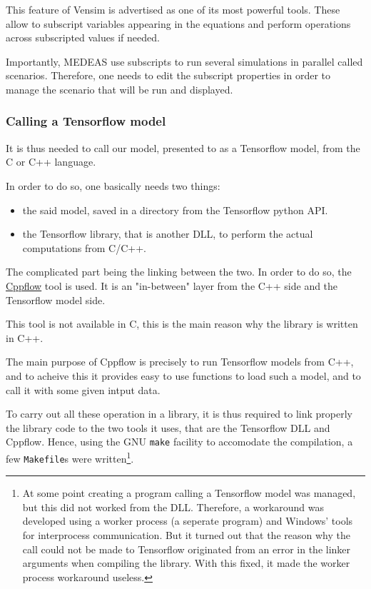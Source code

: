 This feature of Vensim is advertised as one of its most powerful tools. These allow to subscript variables appearing in the equations and perform operations across subscripted values if needed.  

Importantly, MEDEAS use subscripts to run several simulations in parallel called scenarios. Therefore, one needs to edit the subscript properties in order to manage the scenario that will be run and displayed.

\subsubsection{Calling a Tensorflow model}

It is thus needed to call our model, presented to as a Tensorflow model, from the C or C++ language.

In order to do so, one basically needs two things:
\begin{itemize}
    \item the said model, saved in a directory from the Tensorflow python API.
    \item the Tensorflow library, that is another DLL, to perform the actual computations from C/C++.
\end{itemize}

The complicated part being the linking between the two. In order to do so, the \href{https://serizba.github.io/cppflow/}{Cppflow} tool is used. It is an "in-between" layer from the C++ side and the Tensorflow model side.

This tool is not available in C, this is the main reason why the library is written in C++.

The main purpose of Cppflow is precisely to run Tensorflow models from C++, and to acheive this it provides easy to use functions to load such a model, and to call it with some given intput data.

To carry out all these operation in a library, it is thus required to link properly the library code to the two tools it uses, that are the Tensorflow DLL and Cppflow. Hence, using the GNU \texttt{make} facility to accomodate the compilation, a few \texttt{Makefile}s were written\footnote{At some point creating a program calling a Tensorflow model was managed, but this did not worked from the DLL. Therefore, a workaround was developed using a worker process (a seperate program) and Windows' tools for interprocess communication. But it turned out that the reason why the call could not be made to Tensorflow originated from an error in the linker arguments when compiling the library. With this fixed, it made the worker process workaround useless.}.

